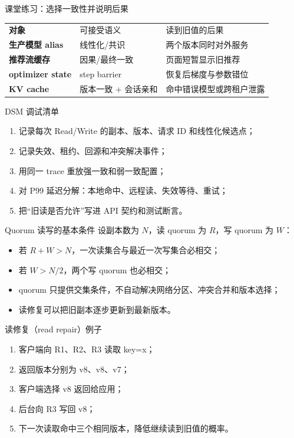 \documentclass[UTF8,fontset=none,aspectratio=169,10pt]{beamer}
\begin{document}
\begin{frame}{课堂练习：选择一致性并说明后果}
\begin{tabularx}{\linewidth}{>{\bfseries}p{3.2cm}XX}
\toprule
对象 & 可接受语义 & 读到旧值的后果 \\
生产模型 alias & 线性化/共识 & 两个版本同时对外服务 \\
推荐流缓存 & 因果/最终一致 & 页面短暂显示旧推荐 \\
optimizer state & step barrier & 恢复后梯度与参数错位 \\
KV cache & 版本一致 + 会话亲和 & 命中错误模型或跨租户泄露 \\
\bottomrule
\end{tabularx}
\end{frame}

\begin{frame}{DSM 调试清单}
\begin{enumerate}
  \item 记录每次 Read/Write 的副本、版本、请求 ID 和线性化候选点；
  \item 记录失效、租约、回源和冲突解决事件；
  \item 用同一 trace 重放强一致和弱一致配置；
  \item 对 P99 延迟分解：本地命中、远程读、失效等待、重试；
  \item 把“旧读是否允许”写进 API 契约和测试断言。
\end{enumerate}
\end{frame}


\begin{frame}{Quorum 读写的基本条件}
设副本数为 $N$，读 quorum 为 $R$，写 quorum 为 $W$：
\begin{itemize}
  \item 若 $R+W>N$，一次读集合与最近一次写集合必相交；
  \item 若 $W>N/2$，两个写 quorum 也必相交；
  \item quorum 只提供交集条件，不自动解决网络分区、冲突合并和版本选择；
  \item 读修复可以把旧副本逐步更新到最新版本。
\end{itemize}
\end{frame}

\begin{frame}{读修复（read repair）例子}
\begin{enumerate}
  \item 客户端向 R1、R2、R3 读取 key=x；
  \item 返回版本分别为 v8、v8、v7；
  \item 客户端选择 v8 返回给应用；
  \item 后台向 R3 写回 v8；
  \item 下一次读取命中三个相同版本，降低继续读到旧值的概率。
\end{enumerate}
\vfill
{}
\end{frame}
\end{document}
